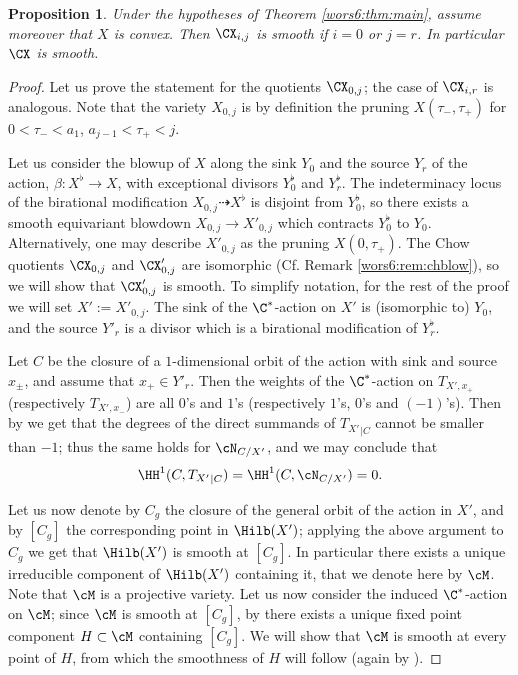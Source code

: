 \documentclass[reqno]{amsproc}
\newtheorem{proposition}[theorem]{Proposition}
\theoremstyle{definition}
\begin{document}
\begin{proposition}\label{wors6:prop:smoothChows} Under the hypotheses of Theorem \ref{wors6:thm:main}, assume moreover that $X$ is convex. Then $\CX_{i,j}$ is smooth if $i=0$ or $j=r$. %
In particular $\CX$ is smooth.
\end{proposition}

\begin{proof}
Let us prove the statement for the quotients $\CX_{0,j}$; the case of $\CX_{i,r}$ is analogous.
Note that the variety $X_{0,j}$ is by definition the pruning $X(\tau_-,\tau_+)$ for $0 < \tau_- <a_1$, $a_{j-1} < \tau_+ < j$.  

Let us consider the blowup of $X$ along the sink $Y_0$ and the source $Y_r$ of the action, $\beta: X^\flat \to X$, with exceptional divisors $Y_0^\flat$ and $Y_r^\flat$.
The indeterminacy locus of the birational modification $X_{0,j} \dashrightarrow X^\flat$ is disjoint from $Y_0^\flat$, so there exists a smooth equivariant blowdown $X_{0,j} \to X'_{0,j}$  which contracts $Y_0^\flat$ to $Y_0$. Alternatively, one may describe $X'_{0,j}$ as the pruning $X(0,\tau_+)$.
The Chow quotients $\CX_{0,j}$ and $\CX'_{0,j}$ are isomorphic (Cf. Remark \ref{wors6:rem:chblow}),
so we will show that $\CX'_{0,j}$ is smooth. To simplify notation, for the rest of the proof we will set $X':=X'_{0,j}$.
The sink of the $\C^*$-action on $X'$ is (isomorphic to) $Y_0$, and the source $Y'_r$ is a divisor  which is a birational modification of $Y_r^\flat$.

Let $C$ be the closure of a $1$-dimensional orbit of the action with sink and source $x_\pm$, and assume that $x_+\in Y'_r$. Then the weights of the $\C^*$-action on $T_{X',x_+}$ (respectively $T_{X',x_-}$) are all $0$'s and $1$'s (respectively $1$'s, $0$'s and $(-1)$'s). Then by \cite[Lemma 2.16]{wors6-WORS1} we get that the degrees of the direct summands of ${T_{X'}}_{|C}$ cannot be smaller than $-1$; thus the same holds for $\cN_{C/X'}$, and we may conclude that 
\begin{equation}\label{wors6:eq:vanish}
\HH^1(C,{T_{X'}}_{|C})=\HH^1(C,\cN_{C/X'})=0.
\end{equation}


Let us now denote by $C_g$ the closure of the general orbit of the action in $X'$, and by $[C_g]$ the corresponding point in $\Hilb(X')$; applying the above argument to $C_g$ we get that $\Hilb(X')$ is smooth at $[C_{g}]$. In particular there exists a unique irreducible component  of $\Hilb(X')$ containing it, that we denote here by $\cM$. Note that $\cM$ is a projective variety.
Let us now consider the induced $\C^*$-action on $\cM$; since $\cM$ is smooth at $[C_g]$, by \cite[Theorem 2.5]{wors6-BB} there exists a unique fixed point component  $H \subset \cM$ containing $[C_g]$. We will show that $\cM$ is smooth at every point of $H$, from which the smoothness of $H$ will follow (again by \cite[Theorem 2.5]{wors6-BB}). 


\end{proof}
\end{document}
